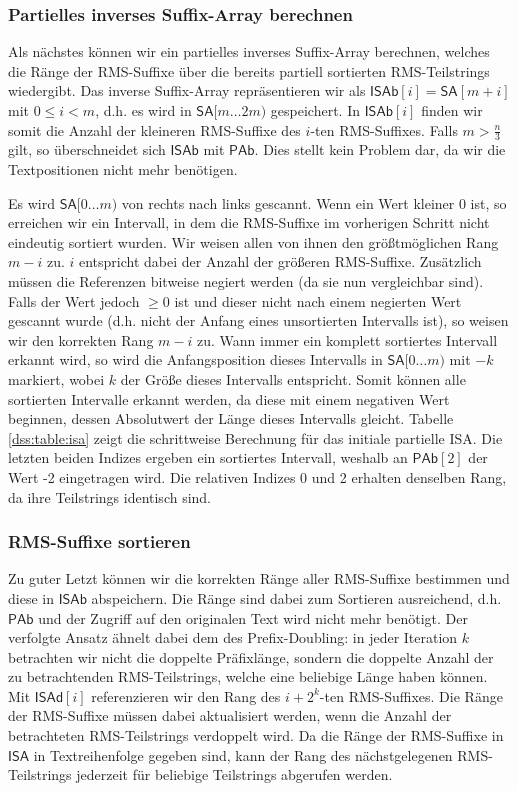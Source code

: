 \subsubsection{Partielles inverses Suffix-Array berechnen}
Als nächstes können wir ein partielles inverses Suffix-Array berechnen, welches die Ränge der RMS-Suffixe über die bereits partiell sortierten RMS-Teilstrings wiedergibt. Das inverse Suffix-Array repräsentieren wir als $\mathsf{ISAb}[i] = \mathsf{SA}[m + i]$ mit $0 \leq i < m$, d.h. es wird in $\mathsf{SA}[m\dots 2m)$ gespeichert. In $\mathsf{ISAb}[i]$ finden wir somit die Anzahl der kleineren RMS-Suffixe des $i$-ten RMS-Suffixes. Falls $m > \frac{n}{3}$ gilt, so überschneidet sich $\mathsf{ISAb}$ mit $\mathsf{PAb}$. Dies stellt kein Problem dar, da wir die Textpositionen nicht mehr benötigen.

Es wird $\mathsf{SA}[0\dots m)$ von rechts nach links gescannt. Wenn ein Wert kleiner 0 ist, so erreichen wir ein Intervall, in dem die RMS-Suffixe im vorherigen Schritt nicht eindeutig sortiert wurden. Wir weisen allen von ihnen den größtmöglichen Rang $m-i$ zu. $i$ entspricht dabei der Anzahl der größeren RMS-Suffixe. Zusätzlich müssen die Referenzen bitweise negiert werden (da sie nun \glqq vergleichbar\grqq{} sind). Falls der Wert jedoch $\geq 0$ ist und dieser nicht nach einem negierten Wert gescannt wurde (d.h. nicht der Anfang eines unsortierten Intervalls ist), so weisen wir den korrekten Rang $m-i$ zu. Wann immer ein komplett sortiertes Intervall erkannt wird, so wird die Anfangsposition dieses Intervalls in $\mathsf{SA}[0\dots m)$ mit $-k$ markiert, wobei $k$ der Größe dieses Intervalls entspricht. Somit können alle sortierten Intervalle erkannt werden, da diese mit einem negativen Wert beginnen, dessen Absolutwert der Länge dieses Intervalls gleicht. Tabelle \ref{dss:table:isa} zeigt die schrittweise Berechnung für das initiale partielle ISA. Die letzten beiden Indizes ergeben ein sortiertes Intervall, weshalb an $\mathsf{PAb}[2]$ der Wert -2 eingetragen wird. Die relativen Indizes 0 und 2 erhalten denselben Rang, da ihre Teilstrings identisch sind.


\subsubsection{RMS-Suffixe sortieren}
Zu guter Letzt können wir die korrekten Ränge aller RMS-Suffixe bestimmen und diese in $\mathsf{ISAb}$ abspeichern. Die Ränge sind dabei zum Sortieren ausreichend, d.h. $\mathsf{PAb}$ und der Zugriff auf den originalen Text wird nicht mehr benötigt. Der verfolgte Ansatz ähnelt dabei dem des Prefix-Doubling: in jeder Iteration $k$ betrachten wir nicht die doppelte Präfixlänge, sondern die doppelte Anzahl der zu betrachtenden RMS-Teilstrings, welche eine beliebige Länge haben können. Mit $\mathsf{ISAd}[i]$ referenzieren wir den Rang des $i + 2^k$-ten RMS-Suffixes. Die Ränge der RMS-Suffixe müssen dabei aktualisiert werden, wenn die Anzahl der betrachteten RMS-Teilstrings verdoppelt wird. Da die Ränge der RMS-Suffixe in $\mathsf{ISA}$ in Textreihenfolge gegeben sind, kann der Rang des nächstgelegenen RMS-Teilstrings jederzeit für beliebige Teilstrings abgerufen werden.

